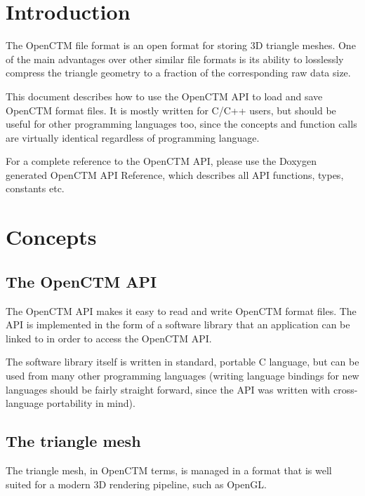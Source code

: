 \tableofcontents



\chapter{Introduction}
The OpenCTM file format is an open format for storing 3D triangle meshes.
One of the main advantages over other similar file formats is its ability
to losslessly compress the triangle geometry to a fraction of the corresponding
raw data size.

This document describes how to use the OpenCTM API to load and save OpenCTM
format files. It is mostly written for C/C++ users, but should be useful for
other programming languages too, since the concepts and function calls are
virtually identical regardless of programming language.

For a complete reference to the OpenCTM API, please use the Doxygen generated
OpenCTM API Reference, which describes all API functions, types, constants etc.




\chapter{Concepts}

\section{The OpenCTM API}
The OpenCTM API makes it easy to read and write OpenCTM format files. The API is
implemented in the form of a software library that an application can be linked
to in order to access the OpenCTM API.

The software library itself is written in standard, portable C language, but
can be used from many other programming languages (writing language bindings
for new languages should be fairly straight forward, since the API was written
with cross-language portability in mind).


\section{The triangle mesh}
The triangle mesh, in OpenCTM terms, is managed in a format that is well suited
for a modern 3D rendering pipeline, such as OpenGL.

